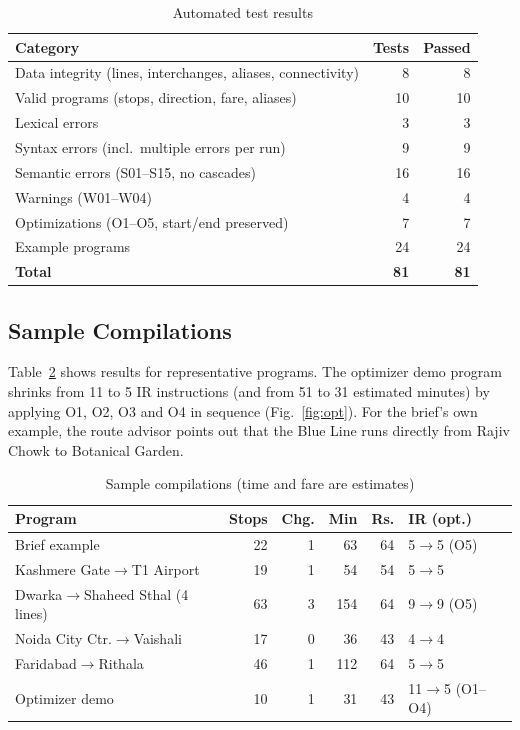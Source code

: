 \documentclass[conference]{IEEEtran}
\begin{document}
\begin{table}[t]
\caption{Automated test results}\label{tab:tests}
\centering\footnotesize
\begin{tabular}{@{}l r r@{}}
\toprule
\textbf{Category} & \textbf{Tests} & \textbf{Passed}\\
\midrule
Data integrity (lines, interchanges, aliases, connectivity) & 8 & 8\\
Valid programs (stops, direction, fare, aliases) & 10 & 10\\
Lexical errors & 3 & 3\\
Syntax errors (incl.\ multiple errors per run) & 9 & 9\\
Semantic errors (S01--S15, no cascades) & 16 & 16\\
Warnings (W01--W04) & 4 & 4\\
Optimizations (O1--O5, start/end preserved) & 7 & 7\\
Example programs & 24 & 24\\
\midrule
\textbf{Total} & \textbf{81} & \textbf{81}\\
\bottomrule
\end{tabular}
\end{table}

\subsection{Sample Compilations}
Table~\ref{tab:samples} shows results for representative programs. The optimizer demo program shrinks from 11 to 5 IR instructions (and from 51 to 31 estimated minutes) by applying O1, O2, O3 and O4 in sequence (Fig.~\ref{fig:opt}). For the brief's own example, the route advisor points out that the Blue Line runs directly from Rajiv Chowk to Botanical Garden.

\begin{table}[t]
\caption{Sample compilations (time and fare are estimates)}\label{tab:samples}
\centering\footnotesize
\setlength{\tabcolsep}{3.2pt}
\begin{tabular}{@{}l r r r r l@{}}
\toprule
\textbf{Program} & \textbf{Stops} & \textbf{Chg.} & \textbf{Min} & \textbf{Rs.} & \textbf{IR (opt.)}\\
\midrule
Brief example & 22 & 1 & 63 & 64 & 5$\to$5 (O5)\\
Kashmere Gate$\to$T1 Airport & 19 & 1 & 54 & 54 & 5$\to$5\\
Dwarka$\to$Shaheed Sthal (4 lines) & 63 & 3 & 154 & 64 & 9$\to$9 (O5)\\
Noida City Ctr.$\to$Vaishali & 17 & 0 & 36 & 43 & 4$\to$4\\
Faridabad$\to$Rithala & 46 & 1 & 112 & 64 & 5$\to$5\\
Optimizer demo & 10 & 1 & 31 & 43 & 11$\to$5 (O1--O4)\\
\bottomrule
\end{tabular}
\end{table}
\end{document}
